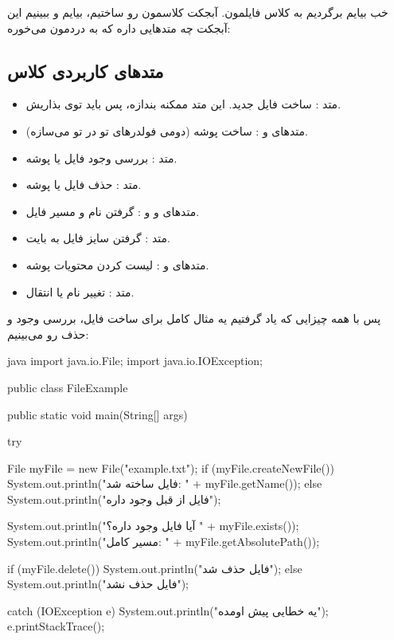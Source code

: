خب بیایم برگردیم به کلاس فایلمون. آبجکت کلاسمون رو ساختیم، بیایم و
ببینیم این آبجکت چه متدهایی داره که به دردمون می‌خوره:

\subsection{متدهای کاربردی کلاس }

\begin{itemize}
\tightlist
\item
  متد  : ساخت فایل جدید. این متد ممکنه
   بندازه، پس باید توی 
  بذاریش.
\item
  متدهای  و  : ساخت پوشه
  (دومی فولدرهای تو در تو می‌سازه).
\item
  متد  : بررسی وجود فایل یا پوشه.
\item
  متد  : حذف فایل یا پوشه.
\item
  متدهای  و  و
   : گرفتن نام و مسیر فایل.
\item
  متد  : گرفتن سایز فایل به بایت.
\item
  متدهای  و  : لیست کردن
  محتویات پوشه.
\item
  متد  : تغییر نام یا انتقال.
\end{itemize}

پس با همه چیزایی که یاد گرفتیم یه مثال کامل برای ساخت فایل، بررسی وجود و
حذف رو می‌بینیم:

\begin{codebox}{java}
import java.io.File;
import java.io.IOException;

public class FileExample {
    public static void main(String[] args) {
        try {
            File myFile = new File("example.txt");
            if (myFile.createNewFile()) {
                System.out.println("فایل ساخته شد: " + myFile.getName());
            } else {
                System.out.println("فایل از قبل وجود داره");
            }
            
            System.out.println("آیا فایل وجود داره؟ " + myFile.exists());
            System.out.println("مسیر کامل: " + myFile.getAbsolutePath());
            
            if (myFile.delete()) {
                System.out.println("فایل حذف شد");
            } else {
                System.out.println("فایل حذف نشد");
            }
        } catch (IOException e) {
            System.out.println("یه خطایی پیش اومده");
            e.printStackTrace();
        }
    }
}
\end{codebox}

